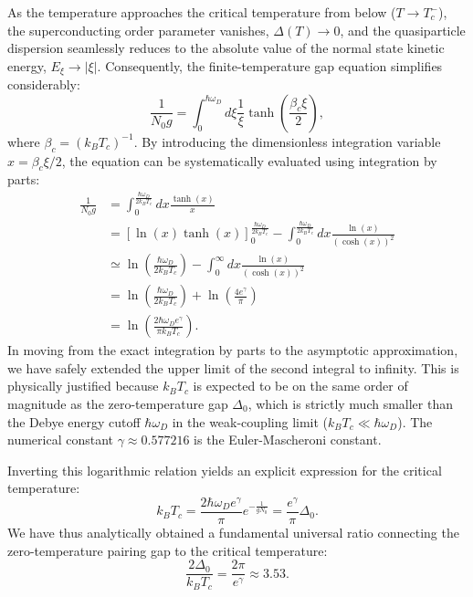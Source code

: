As the temperature approaches the critical temperature from below (\( T \to T_c^- \)), the superconducting order parameter vanishes, \( \Delta(T) \to 0 \), and the quasiparticle dispersion seamlessly reduces to the absolute value of the normal state kinetic energy, \( E_\xi \to |\xi| \). Consequently, the finite-temperature gap equation simplifies considerably:
\[
    \frac{1}{N_0 g} = \int_0^{\hbar\omega_D} d\xi \frac{1}{\xi} \tanh\left(\frac{\beta_c \xi}{2}\right),
\]
where \( \beta_c = (k_B T_c)^{-1} \). By introducing the dimensionless integration variable \( x = \beta_c \xi / 2 \), the equation can be systematically evaluated using integration by parts:
\[
    \begin{aligned}
        \frac{1}{N_0 g} & = \int_0^{\frac{\hbar\omega_D}{2k_B T_c}} dx \frac{\tanh(x)}{x}                                                                              \\
                        & = \left[ \ln(x) \tanh(x) \right]_0^{\frac{\hbar\omega_D}{2k_B T_c}} - \int_0^{\frac{\hbar\omega_D}{2k_B T_c}} dx \frac{\ln(x)}{(\cosh(x))^2} \\
                        & \simeq \ln\left( \frac{\hbar\omega_D}{2k_B T_c} \right) - \int_0^\infty dx \frac{\ln(x)}{(\cosh(x))^2}                                       \\
                        & = \ln\left( \frac{\hbar\omega_D}{2k_B T_c} \right) + \ln\left( \frac{4e^\gamma}{\pi} \right)                                                 \\
                        & = \ln\left( \frac{2\hbar\omega_D e^\gamma}{\pi k_B T_c} \right).
    \end{aligned}
\]
In moving from the exact integration by parts to the asymptotic approximation, we have safely extended the upper limit of the second integral to infinity. This is physically justified because \( k_B T_c \) is expected to be on the same order of magnitude as the zero-temperature gap \( \Delta_0 \), which is strictly much smaller than the Debye energy cutoff \( \hbar\omega_D \) in the weak-coupling limit (\( k_B T_c \ll \hbar\omega_D \)). The numerical constant \( \gamma \approx 0.577216 \) is the Euler-Mascheroni constant.

Inverting this logarithmic relation yields an explicit expression for the critical temperature:
\[
    k_B T_c = \frac{2\hbar\omega_D e^\gamma}{\pi} e^{-\frac{1}{g N_0}} = \frac{e^\gamma}{\pi} \Delta_0.
\]
We have thus analytically obtained a fundamental universal ratio connecting the zero-temperature pairing gap to the critical temperature:
\begin{equation} \label{eq:bcs_universal_ratio}
    \frac{2\Delta_0}{k_B T_c} = \frac{2\pi}{e^\gamma} \approx 3.53.
\end{equation}


